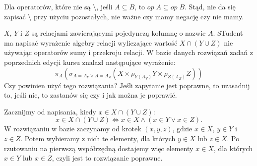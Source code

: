 \documentclass{article}
\begin{document}
\begin{solution}
%

  Dla operatorów, które nie są $\setminus$, jeśli $A\subseteq B$, to $op\; A\subseteq op\; B$. Stąd, nie da się zapisać $\setminus$ przy użyciu pozostałych, nie ważne czy mamy negację czy nie mamy.
\end{solution}

\begin{problem}
  $X$, $Y$ i $Z$ są relacjami zawierającymi pojedynczą kolumnę o nazwie $A$. STudent ma napisać wyrażenie algebry relacji wyliczające wartość $X\cap (Y\cup Z)$ nie używając operatorów sumy i przekroju relacji. W bazie danych rozwiązań zadań z poprzednich edycji kursu znalazł następujące wyrażenie:
  $$\pi_A(\sigma_{A=A_Y\lor A=A_Z}(X\times \rho_{Y(A_Y)}Y\times\rho_{Z(A_Z)}Z))$$
  Czy powinien użyć tego rozwiązania? Jeśli zapytanie jest poprawne, to uzasadnij to, jeśli nie, to zastanów się czy i jak można je poprawić.
\end{problem}

\begin{solution}
  Zacznijmy od napisania, kiedy $x\in X\cap(Y\cup Z)$:
  $$x\in X\cap (Y\cup Z)\iff x\in X\land (x\in Y\lor x\in Z).$$
  W rozwiązaniu w bazie zaczynamy od krotek $(x, y, z)$, gdzie $x\in X$, $y\in Y$ i $z\in Z$. Potem wybieramy z nich te elementy, dla których $y\in X$ lub $z\in X$. Po rzutowaniu na pierwszą współrzędną dostajemy więc elementy $x\in X$, dla których $x\in Y$ lub $x\in Z$, czyli jest to rozwiązanie poprawne. 
\end{solution}
\end{document}
